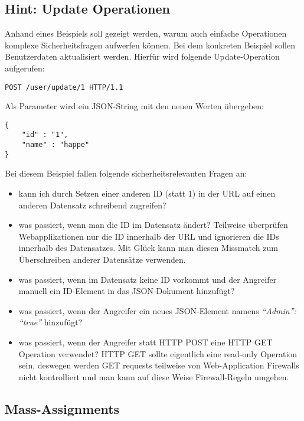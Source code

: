 \subsection{Hint: Update Operationen}

Anhand eines Beispiels soll gezeigt werden, warum auch einfache Operationen komplexe Sicherheitsfragen aufwerfen können. Bei dem konkreten Beispiel sollen Benutzerdaten aktualisiert werden. Hierfür wird folgende Update-Operation aufgerufen:

\begin{verbatim}
POST /user/update/1 HTTP/1.1
\end{verbatim}

Als Parameter wird ein JSON-String mit den neuen Werten übergeben:

\begin{listing}[H]
\begin{verbatim}
{
	"id" : "1",
	"name" : "happe"
}
\end{verbatim}
\end{listing}

Bei diesem Beispiel fallen folgende sicherheitsrelevanten Fragen an:

\begin{itemize}
	\item kann ich durch Setzen einer anderen ID (statt 1) in der URL auf einen anderen Datensatz schreibend zugreifen?
	\item was passiert, wenn man die ID im Datensatz ändert? Teilweise überprüfen Webapplikationen nur die ID innerhalb der URL und ignorieren die IDs innerhalb des Datensatzes. Mit Glück kann man diesen Missmatch zum Überschreiben anderer Datensätze verwenden.
	\item was passiert, wenn im Datensatz keine ID vorkommt und der Angreifer manuell ein ID-Element in das JSON-Dokument hinzufügt?
	\item was passiert, wenn der Angreifer ein neues JSON-Element namens \textit{``Admin'': ``true''} hinzufügt?
	\item was passiert, wenn der Angreifer statt HTTP POST eine HTTP GET Operation verwendet? HTTP GET sollte eigentlich eine read-only Operation sein, deswegen werden GET requests teilweise von Web-Application Firewalls nicht kontrolliert und man kann auf diese Weise Firewall-Regeln umgehen.
\end{itemize}

\subsection{Mass-Assignments}

